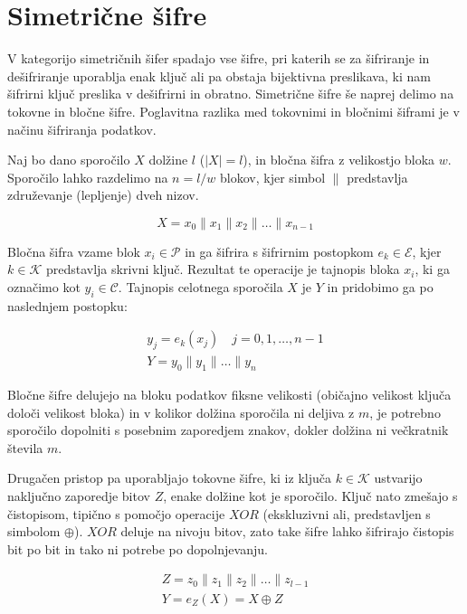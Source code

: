 \documentclass[12pt,a4paper,openany,tikz]{book}
\theoremstyle{plain}
\theoremstyle{definition}
\begin{document}
\section{Simetrične šifre}

V kategorijo simetričnih šifer spadajo vse šifre, pri katerih se za šifriranje in dešifriranje uporablja enak ključ ali pa obstaja bijektivna preslikava, ki nam šifrirni ključ preslika v dešifrirni in obratno. Simetrične šifre še naprej delimo na tokovne in bločne šifre. Poglavitna razlika med tokovnimi in bločnimi šiframi je v načinu šifriranja podatkov.

Naj bo dano sporočilo $X$ dolžine $l$ ($|X|=l$), in bločna šifra z velikostjo bloka $w$. Sporočilo lahko razdelimo na $n=l/w$ blokov, kjer simbol $\|$ predstavlja združevanje (lepljenje) dveh nizov.

$$
X=x_0 \| x_1 \| x_2 \| \dotsc \| x_{n-1}
$$

Bločna šifra vzame blok $x_i \in \mathcal{P}$ in ga šifrira s šifrirnim postopkom $e_k \in \mathcal{E}$, kjer $k \in \mathcal{K}$ predstavlja skrivni ključ. Rezultat te operacije je tajnopis bloka $x_i$, ki ga označimo kot $y_i \in \mathcal{C}$. Tajnopis celotnega sporočila $X$ je $Y$ in pridobimo ga po naslednjem postopku:

\begin{gather*}
  y_j = e_k(x_j) \quad j=0,1,\dotsc,n-1\\
  Y = y_0 \| y_1 \| \dotsc \| y_n
\end{gather*}

Bločne šifre delujejo na bloku podatkov fiksne velikosti (običajno velikost ključa določi velikost bloka) in v kolikor dolžina sporočila ni deljiva z $m$, je potrebno sporočilo dopolniti s posebnim zaporedjem znakov, dokler dolžina ni večkratnik števila $m$.

Drugačen pristop pa uporabljajo tokovne šifre, ki iz ključa $k \in \mathcal{K}$ ustvarijo naključno zaporedje bitov $Z$, enake dolžine kot je sporočilo. Ključ nato zmešajo s čistopisom, tipično s pomočjo operacije $XOR$ (ekskluzivni ali, predstavljen s simbolom $\oplus$). $XOR$ deluje na nivoju bitov, zato take šifre lahko šifrirajo čistopis bit po bit in tako ni potrebe po dopolnjevanju.

\begin{gather*}
Z=z_0 \| z_1 \| z_2 \| \dotsc \| z_{l-1} \\
Y=e_Z(X)= X \oplus Z \\
\end{gather*}
\end{document}
